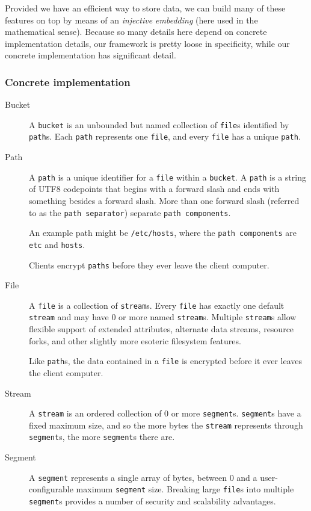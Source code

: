 \documentclass[a4paper,10pt]{article}
\newcommand{\x}[1]{{\tt #1}}
\newcommand{\code}[1]{{\tt #1}}
\begin{document}
Provided we have an efficient way to store data, we can build many of these
features on top by means of an {\em injective embedding} (here used in the
mathematical sense). Because so many details here depend on concrete
implementation details, our framework is pretty loose in specificity, while
our concrete implementation has significant detail.

\subsubsection{Concrete implementation}

\begin{description}
\item[Bucket] A \x{bucket} is an unbounded but named collection of
\x{file}s identified by \x{path}s. Each \x{path} represents one
\x{file}, and every \x{file} has a unique \x{path}.

\item[Path] A \x{path} is a unique identifier for a \x{file} within a
\x{bucket}. A \x{path} is a string of UTF8 codepoints that begins with a forward
slash and ends with something besides a forward slash. More than one forward
slash (referred to as the \x{path separator}) separate \x{path components}.

An example path might be \code{/etc/hosts}, where the \x{path components} are
\code{etc} and \code{hosts}.

Clients encrypt \x{paths} before they ever leave the client computer.

\item[File] A \x{file} is a collection of \x{stream}s. Every \x{file} has
exactly one default \x{stream} and may have 0 or more named \x{stream}s.
Multiple \x{stream}s allow flexible support of extended attributes, alternate
data streams, resource forks, and other slightly more esoteric filesystem
features.

Like \x{path}s, the data contained in a \x{file} is encrypted before it ever
leaves the client computer.

\item[Stream] A \x{stream} is an ordered collection of 0 or more \x{segment}s.
\x{segment}s have a fixed maximum size, and so the more bytes the \x{stream}
represents through \x{segment}s, the more \x{segment}s there are.

\item[Segment] A \x{segment} represents a single array of bytes, between 0 and a
user-configurable maximum \x{segment} size. Breaking large \x{file}s into
multiple \x{segment}s provides a number of security and scalability advantages.


\end{description}
\end{document}
